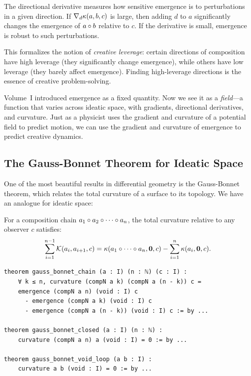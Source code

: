 \begin{interpretation}
The directional derivative measures how sensitive emergence is to perturbations
in a given direction. If $\nabla_d \kappa(a, b, c)$ is large, then adding $d$
to $a$ significantly changes the emergence of $a \circ b$ relative to $c$.
If the derivative is small, emergence is robust to such perturbations.

This formalizes the notion of \emph{creative leverage}: certain directions of
composition have high leverage (they significantly change emergence), while
others have low leverage (they barely affect emergence). Finding high-leverage
directions is the essence of creative problem-solving.

Volume~I introduced emergence as a fixed quantity. Now we see it as a
\emph{field}---a function that varies across ideatic space, with gradients,
directional derivatives, and curvature. Just as a physicist uses the gradient
and curvature of a potential field to predict motion, we can use the gradient
and curvature of emergence to predict creative dynamics.
\end{interpretation}

\subsection{The Gauss-Bonnet Theorem for Ideatic Space}

One of the most beautiful results in differential geometry is the Gauss-Bonnet
theorem, which relates the total curvature of a surface to its topology. We
have an analogue for ideatic space:

\begin{theorem}
\label{thm:gauss-bonnet-chain}
For a composition chain $a_1 \circ a_2 \circ \cdots \circ a_n$, the
total curvature relative to any observer $c$ satisfies:
\[
  \sum_{i=1}^{n-1} \mathcal{K}(a_i, a_{i+1}, c) = \kappa(a_1 \circ \cdots \circ a_n, \mathbf{0}, c)
    - \sum_{i=1}^n \kappa(a_i, \mathbf{0}, c).
\]
\end{theorem}

\begin{lstlisting}[caption={Gauss-Bonnet theorems (IDT\_v3\_Emergence.lean)}]
theorem gauss_bonnet_chain (a : I) (n : ℕ) (c : I) :
    ∀ k ≤ n, curvature (compN a k) (compN a (n - k)) c =
    emergence (compN a n) (void : I) c
      - emergence (compN a k) (void : I) c
      - emergence (compN a (n - k)) (void : I) c := by ...

theorem gauss_bonnet_closed (a : I) (n : ℕ) :
    curvature (compN a n) a (void : I) = 0 := by ...

theorem gauss_bonnet_void_loop (a b : I) :
    curvature a b (void : I) = 0 := by ...
\end{lstlisting}

